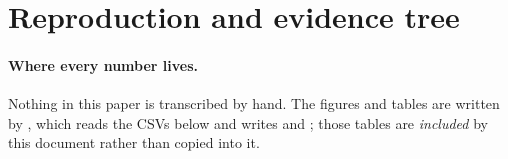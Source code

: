 \documentclass{article}
\begin{document}
{\footnotesize\setlength{\tabcolsep}{4pt}}

\section{Reproduction and evidence tree}
\label{app:evidence}

\paragraph{Where every number lives.} Nothing in this paper is transcribed by hand. The
figures and tables are written by , which reads the CSVs below
and writes  and ; those tables are
\emph{included} by this document rather than copied into it.
\end{document}
